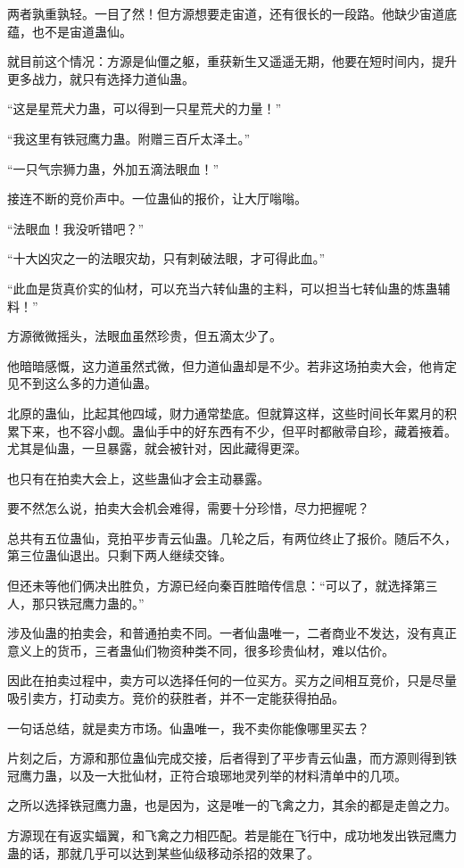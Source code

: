\begin{this_body}
两者孰重孰轻。一目了然！但方源想要走宙道，还有很长的一段路。他缺少宙道底蕴，也不是宙道蛊仙。

就目前这个情况：方源是仙僵之躯，重获新生又遥遥无期，他要在短时间内，提升更多战力，就只有选择力道仙蛊。

“这是星荒犬力蛊，可以得到一只星荒犬的力量！”

“我这里有铁冠鹰力蛊。附赠三百斤太泽土。”

“一只气宗狮力蛊，外加五滴法眼血！”

接连不断的竞价声中。一位蛊仙的报价，让大厅嗡嗡。

“法眼血！我没听错吧？”

“十大凶灾之一的法眼灾劫，只有刺破法眼，才可得此血。”

“此血是货真价实的仙材，可以充当六转仙蛊的主料，可以担当七转仙蛊的炼蛊辅料！”

方源微微摇头，法眼血虽然珍贵，但五滴太少了。

他暗暗感慨，这力道虽然式微，但力道仙蛊却是不少。若非这场拍卖大会，他肯定见不到这么多的力道仙蛊。

北原的蛊仙，比起其他四域，财力通常垫底。但就算这样，这些时间长年累月的积累下来，也不容小觑。蛊仙手中的好东西有不少，但平时都敝帚自珍，藏着掖着。尤其是仙蛊，一旦暴露，就会被针对，因此藏得更深。

也只有在拍卖大会上，这些蛊仙才会主动暴露。

要不然怎么说，拍卖大会机会难得，需要十分珍惜，尽力把握呢？

总共有五位蛊仙，竞拍平步青云仙蛊。几轮之后，有两位终止了报价。随后不久，第三位蛊仙退出。只剩下两人继续交锋。

但还未等他们俩决出胜负，方源已经向秦百胜暗传信息：“可以了，就选择第三人，那只铁冠鹰力蛊的。”

涉及仙蛊的拍卖会，和普通拍卖不同。一者仙蛊唯一，二者商业不发达，没有真正意义上的货币，三者蛊仙们物资种类不同，很多珍贵仙材，难以估价。

因此在拍卖过程中，卖方可以选择任何的一位买方。买方之间相互竞价，只是尽量吸引卖方，打动卖方。竞价的获胜者，并不一定能获得拍品。

一句话总结，就是卖方市场。仙蛊唯一，我不卖你能像哪里买去？

片刻之后，方源和那位蛊仙完成交接，后者得到了平步青云仙蛊，而方源则得到铁冠鹰力蛊，以及一大批仙材，正符合琅琊地灵列举的材料清单中的几项。

之所以选择铁冠鹰力蛊，也是因为，这是唯一的飞禽之力，其余的都是走兽之力。

方源现在有返实蝠翼，和飞禽之力相匹配。若是能在飞行中，成功地发出铁冠鹰力蛊的话，那就几乎可以达到某些仙级移动杀招的效果了。


\end{this_body}
